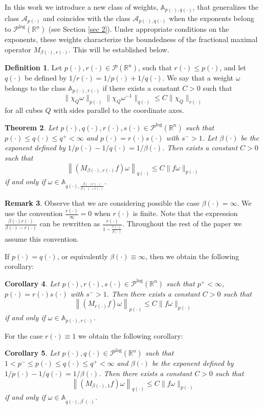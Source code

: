 \documentclass[a4paper,11pt,reqno]{amsart}
\theoremstyle{plain}
\numberwithin{equation}{section}
\newtheorem{teo}{Theorem}[section]
\newtheorem{coro}[teo]{Corollary}
\theoremstyle{definition}
\newtheorem{remark}[teo]{Remark}
\newtheorem{defi}[teo]{Definition}
\newcommand{\R}{{\mathbb{R}^n}}
\begin{document}
In this work we introduce a new class of weights,  $\mathbb{A}_{p(\cdot),q(\cdot)}$, that generalizes the class $\mathcal{A}_{p(\cdot)}$ and coincides with the class $\mathcal{A}_{p(\cdot),q(\cdot)}$ when the exponents belong to $\mathcal{P}^{\text{log}}(\R)$ (see Section \ref{sec 2}). Under appropriate conditions on the exponents, these weights characterize the boundedness of the fractional maximal operator $M_{\beta(\cdot),r(\cdot)}$. This will be established below.
\begin{defi}\label{Apr}
	Let $p(\cdot),r(\cdot)\in\mathcal{P}(\R)$, such that $r(\cdot)\leq p(\cdot)$, and let $q(\cdot)$ be defined by $1/r(\cdot)=1/p(\cdot)+1/q(\cdot)$. We say that a weight $\omega$ belongs to the class $\mathbb{A}_{p{(\cdot)},r(\cdot)}$ if there exists a constant $C>0$ such that 
	$$\|\chi_Q\omega\|_{p(\cdot)}\|\chi_Q\omega^{-1}\|_{q(\cdot)}\leq C\|\chi_Q\|_{r(\cdot)}$$	 
	for all cubes $Q$ with sides parallel to the coordinate axes.
\end{defi}
\begin{teo}\label{teo M}
	Let $p(\cdot),q(\cdot),r(\cdot),s(\cdot)\in\mathcal{P}^{\log}(\R)$ such that $p(\cdot)\leq q(\cdot)\leq q^+<\infty$ and $p(\cdot)=r(\cdot)s(\cdot)$ with $s^->1$. Let $\beta(\cdot)$ be the exponent defined by $1/p(\cdot)-1/q(\cdot)=1/\beta(\cdot)$. Then exists a constant $C>0$ such that
	$$\left\|(M_{\beta(\cdot),r(\cdot)}f)\omega\right\|_{q(\cdot)}\leq C\|f\omega\|_{p(\cdot)}$$
	if and only if
	$\omega\in \mathbb{A}_{q(\cdot),\frac{\beta(\cdot) r(\cdot)}{\beta(\cdot)-r(\cdot)}}$.
\end{teo}
\begin{remark}
	 Observe that we are considering possible the case $\beta(\cdot)=\infty$.  We use the convention $\frac{r(\cdot)}{\infty}=0$ when $r(\cdot)$ is finite. Note that the expression $\frac{\beta(\cdot) r(\cdot)}{\beta(\cdot)-r(\cdot)}$ can be rewritten as $\frac{r(\cdot)}{1-\frac{r(\cdot)}{\beta(\cdot)}}$. Throughout the rest of the paper we assume this convention.
\end{remark}
If $p(\cdot)=q(\cdot)$, or equivalently $\beta(\cdot)\equiv\infty$, then we obtain the following corollary:
\begin{coro}\label{coro Mr}
	Let ${p(\cdot)},{r(\cdot)},s(\cdot)\in\mathcal{P}^{\text{log}}(\R)$ such that $p^+<\infty$, ${p(\cdot)}={r(\cdot)}{s(\cdot)}$ with $s^->1$. Then there exists a constant $C>0$ such that 
	$$\left\|(M_{r(\cdot)} f)\omega\right\|_{p(\cdot)}\leq C\|f\omega\|_{p(\cdot)}$$
	if and only if
	$\omega\in \mathbb{A}_{{p(\cdot)},{r(\cdot)}}$. 
\end{coro}
For the case $r(\cdot)\equiv1$ we obtain the following corollary:
\begin{coro}
	Let ${p(\cdot)},{q(\cdot)}\in\mathcal{P}^{\text{log}}(\R)$ such that $1<p^-\leq{p(\cdot)}\leq{q(\cdot)}\leq q^+<\infty$ and ${\beta(\cdot)}$ be the exponent defined by $1/p(\cdot)-1/q(\cdot)=1/\beta(\cdot)$. Then there exists a constant $C>0$ such that 
	$$\left\|(M_{{\beta(\cdot)},1}f)\omega\right\|_{q(\cdot)}\leq C\|f\omega\|_{p(\cdot)}$$
	if and only if
	$\omega\in \mathbb{A}_{{q(\cdot)},\beta^\prime(\cdot)}$.
\end{coro}
\end{document}
